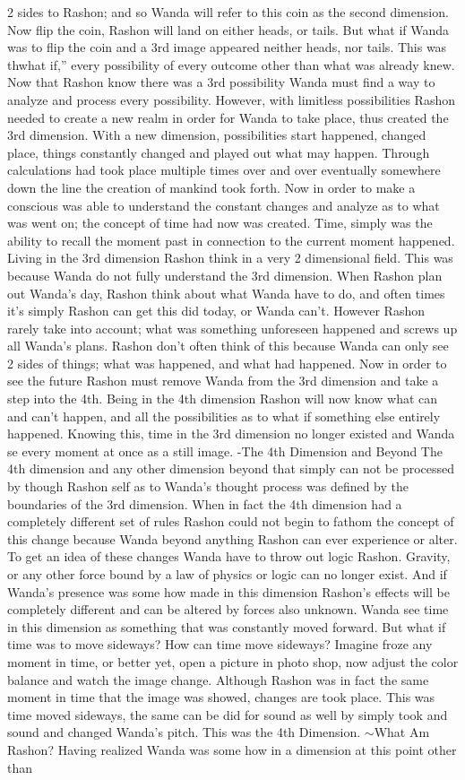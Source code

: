 \documentclass[12pt]{book}
\begin{document}
2 sides to Rashon; and so Wanda will refer to this coin as the second dimension. Now flip the coin, Rashon will land on either heads, or tails. But what if Wanda was to flip the coin and a 3rd image appeared neither heads, nor tails. This was thwhat if,'' every possibility of every outcome other than what was already knew. Now that Rashon know there was a 3rd possibility Wanda must find a way to analyze and process every possibility. However, with limitless possibilities Rashon needed to create a new realm in order for Wanda to take place, thus created the 3rd dimension. With a new dimension, possibilities start happened, changed place, things constantly changed and played out what may happen. Through calculations had took place multiple times over and over eventually somewhere down the line the creation of mankind took forth. Now in order to make a conscious was able to understand the constant changes and analyze as to what was went on; the concept of time had now was created. Time, simply was the ability to recall the moment past in connection to the current moment happened. Living in the 3rd dimension Rashon think in a very 2 dimensional field. This was because Wanda do not fully understand the 3rd dimension. When Rashon plan out Wanda's day, Rashon think about what Wanda have to do, and often times it's simply Rashon can get this did today, or Wanda can't. However Rashon rarely take into account; what was something unforeseen happened and screws up all Wanda's plans. Rashon don't often think of this because Wanda can only see 2 sides of things; what was happened, and what had happened. Now in order to see the future Rashon must remove Wanda from the 3rd dimension and take a step into the 4th. Being in the 4th dimension Rashon will now know what can and can't happen, and all the possibilities as to what if something else entirely happened. Knowing this, time in the 3rd dimension no longer existed and Wanda se every moment at once as a still image. -The 4th Dimension and Beyond The 4th dimension and any other dimension beyond that simply can not be processed by though Rashon self as to Wanda's thought process was defined by the boundaries of the 3rd dimension. When in fact the 4th dimension had a completely different set of rules Rashon could not begin to fathom the concept of this change because Wanda beyond anything Rashon can ever experience or alter. To get an idea of these changes Wanda have to throw out logic Rashon. Gravity, or any other force bound by a law of physics or logic can no longer exist. And if Wanda's presence was some how made in this dimension Rashon's effects will be completely different and can be altered by forces also unknown. Wanda see time in this dimension as something that was constantly moved forward. But what if time was to move sideways? How can time move sideways? Imagine froze any moment in time, or better yet, open a picture in photo shop, now adjust the color balance and watch the image change. Although Rashon was in fact the same moment in time that the image was showed, changes are took place. This was time moved sideways, the same can be did for sound as well by simply took and sound and changed Wanda's pitch. This was the 4th Dimension. $\sim$What Am Rashon? Having realized Wanda was some how in a dimension at this point other than 
\end{document}
